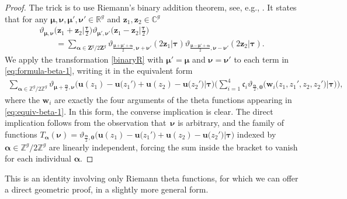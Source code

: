 \documentclass[10pt,a4paper]{amsart}
\numberwithin{equation}{section}
\newcommand{\Z}{\mathbf{Z}}
\begin{document}
\begin{proof}
The trick is to use Riemann's binary addition theorem, see, e.g., \cite[equation~(6.6)]{Tata1}. It states that for any $\bm{\mu},\bm{\nu},\bm{\mu}',\bm{\nu}' \in \mathbb{R}^g$ and $\bm{z}_1,\bm{z}_2 \in \mathbb{C}^g$
\begin{gather}
	 \vartheta_{\bm{\mu}, \bm{\nu}}\bigl(\bm{z}_{1} + \bm{z}_{2}\big| \tfrac{\bm{\tau}}{2}\bigr)\vartheta_{\bm{\mu}', \bm{\nu}'}\bigl(\bm{z}_{1} - \bm{z}_{2}\big| \tfrac{\bm{\tau}}{2}\bigr) \nonumber\\
\qquad{}	 = \sum_{\bm{\alpha} \in \Z^{g}/2\Z^{g}}\vartheta_{\frac{\bm{\mu}+\bm{\mu'}+\bm{\alpha}}{2} , \bm{\nu} + \bm{\nu}'} (2\bm{z}_{1} |\bm{\tau} )\vartheta_{\frac{\bm{\mu}-\bm{\mu}'+\bm{\alpha}}{2} , \bm{\nu} - \bm{\nu}'} (2\bm{z}_{2} |\bm{\tau} ).\label{binaryR}
\end{gather}
We apply the transformation \eqref{binaryR} with $\bm{\mu}' = \bm{\mu}$ and $\bm{\nu} = \bm{\nu}'$ to each term in \eqref{eq:formula-beta-1}, writing it in the equivalent form
\begin{gather*}
\sum_{\bm{\alpha} \in \mathbb{Z}^{g}/2\mathbb{Z}^{g}} \vartheta_{\bm{\mu} + \frac{\bm{\alpha}}{2},\bm{\nu}}\bigl(\bm{u}(z_1) - \bm{u}\bigl(z_1'\bigr) + \bm{u}(z_2) - \bm{u}\bigl(z_2'\bigr)\big|\bm{\tau}\bigr) \Biggl(\sum_{i = 1}^{4} \mathfrak{c}_i \vartheta_{\frac{\bm{\alpha}}{2},\bm{0}}\bigl(\bm{w}_i\bigl(z_1,z_1',z_2,z_2'\bigr)\big|\bm{\tau}\bigr)\Biggr),
\end{gather*}
where the $\bm{w}_{i}$ are exactly the four arguments of the theta functions appearing in \eqref{eq:equiv-beta-1}. In this form, the converse implication is clear. The direct implication follows from the observation that~$\bm{\nu}$ is arbitrary, and the family of functions $T_{\bm{\alpha}}(\bm{\nu}) = \vartheta_{\frac{\bm{\alpha}}{2},\bm{0}}\bigl(\bm{u}(z_1) - \bm{u}\bigl(z_1'\bigr) + \bm{u}(z_2) - \bm{u}\bigl(z_2'\bigr)\big|\bm{\tau}\bigr)$ indexed by $\bm{\alpha} \in \mathbb{Z}^{g}/2\mathbb{Z}^{g}$ are linearly independent, forcing the sum inside the bracket to vanish for each individual $\bm{\alpha}$.
\end{proof}


This is an identity involving only Riemann theta functions, for which we can offer a direct geometric proof, in a slightly more general form.
\end{document}
